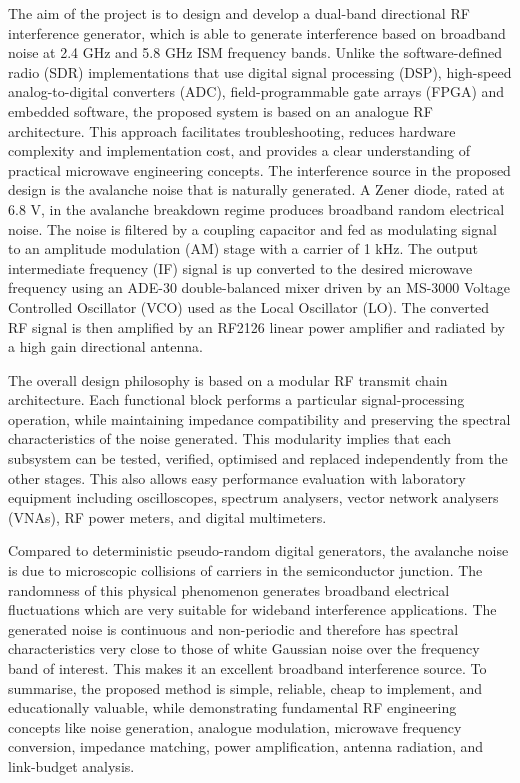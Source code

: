 \documentclass[12pt,a4paper]{report}
\begin{document}
	The aim of the project is to design and develop a dual-band directional RF interference generator, which is able to generate interference based on broadband noise at 2.4 GHz and 5.8 GHz ISM frequency bands. Unlike the software-defined radio (SDR) implementations that use digital signal processing (DSP), high-speed analog-to-digital converters (ADC), field-programmable gate arrays (FPGA) and embedded software, the proposed system is based on an analogue RF architecture. This approach facilitates troubleshooting, reduces hardware complexity and implementation cost, and provides a clear understanding of practical microwave engineering concepts.
	\vspace{0.5cm}
	The interference source in the proposed design is the avalanche noise that is naturally generated.  A Zener diode, rated at 6.8 V, in the avalanche breakdown regime produces broadband random electrical noise. The noise is filtered by a coupling capacitor and fed as modulating signal to an amplitude modulation (AM) stage with a carrier of 1 kHz. The output intermediate frequency (IF) signal is up converted to the desired microwave frequency using an ADE-30 double-balanced mixer driven by an MS-3000 Voltage Controlled Oscillator (VCO) used as the Local Oscillator (LO). The converted RF signal is then amplified by an RF2126 linear power amplifier and radiated by a high gain directional antenna.
	\vspace{0.5cm}
	
	The overall design philosophy is based on a modular RF transmit chain architecture. Each functional block performs a particular signal-processing operation, while maintaining impedance compatibility and preserving the spectral characteristics of the noise generated. This modularity implies that each subsystem can be tested, verified, optimised and replaced independently from the other stages. This also allows easy performance evaluation with laboratory equipment including oscilloscopes, spectrum analysers, vector network analysers (VNAs), RF power meters, and digital multimeters.
	\vspace{0.5cm}
	
	Compared to deterministic pseudo-random digital generators, the avalanche noise is due to microscopic collisions of carriers in the semiconductor junction. The randomness of this physical phenomenon generates broadband electrical fluctuations which are very suitable for wideband interference applications. The generated noise is continuous and non-periodic and therefore has spectral characteristics very close to those of white Gaussian noise over the frequency band of interest. This makes it an excellent broadband interference source. 
	To summarise, the proposed method is simple, reliable, cheap to implement, and educationally valuable, while demonstrating fundamental RF engineering concepts like noise generation, analogue modulation, microwave frequency conversion, impedance matching, power amplification, antenna radiation, and link-budget analysis.
	
\end{document}
